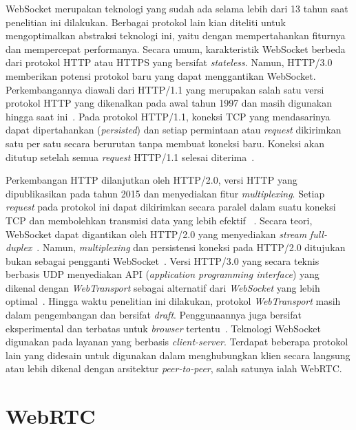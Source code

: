 WebSocket merupakan teknologi yang sudah ada selama lebih dari 13 tahun saat penelitian ini dilakukan. Berbagai protokol lain kian diteliti untuk mengoptimalkan abstraksi teknologi ini, yaitu dengan mempertahankan fiturnya dan mempercepat performanya. Secara umum, karakteristik WebSocket berbeda dari protokol HTTP atau HTTPS yang bersifat \textit{stateless}. Namun, HTTP/3.0 memberikan potensi protokol baru yang dapat menggantikan WebSocket. Perkembangannya diawali dari HTTP/1.1 yang merupakan salah satu versi protokol HTTP yang dikenalkan pada awal tahun 1997 dan masih digunakan hingga saat ini~\citep{krishnamurthy1999key, fielding2015hypertext}. Pada protokol HTTP/1.1, koneksi TCP yang mendasarinya dapat dipertahankan (\textit{persisted}) dan setiap permintaan atau \textit{request} dikirimkan satu per satu secara berurutan tanpa membuat koneksi baru. Koneksi akan ditutup setelah semua \textit{request} HTTP/1.1 selesai diterima~\citep{fielding2015hypertext}.

Perkembangan HTTP dilanjutkan oleh HTTP/2.0, versi HTTP yang dipublikasikan pada tahun 2015 dan menyediakan fitur \textit{multiplexing}. Setiap \textit{request} pada protokol ini dapat dikirimkan secara paralel dalam suatu koneksi TCP dan membolehkan transmisi data yang lebih efektif ~\citep{belshe2015hypertext}. Secara teori, WebSocket dapat digantikan oleh HTTP/2.0 yang menyediakan \textit{stream} \textit{full-duplex}~\citep{stenberg2014http2}. Namun, \textit{multiplexing} dan persistensi koneksi pada HTTP/2.0 ditujukan bukan sebagai pengganti WebSocket~\citep{fietze2017http}. Versi HTTP/3.0 yang secara teknis berbasis UDP menyediakan API (\textit{application programming interface}) yang dikenal dengan \textit{WebTransport} sebagai alternatif dari \textit{WebSocket} yang lebih optimal~\citep{rfc9114, ietf-webtrans-http3-03}. Hingga waktu penelitian ini dilakukan, protokol \textit{WebTransport} masih dalam pengembangan dan bersifat \textit{draft}. Penggunaannya juga bersifat eksperimental dan terbatas untuk \textit{browser} tertentu~\citep{ietf-webtrans-http3-03}. Teknologi WebSocket digunakan pada layanan yang berbasis \textit{client-server}. Terdapat beberapa protokol lain yang didesain untuk digunakan dalam menghubungkan klien secara langsung atau lebih dikenal dengan arsitektur \textit{peer-to-peer}, salah satunya ialah WebRTC.


\section{WebRTC}

